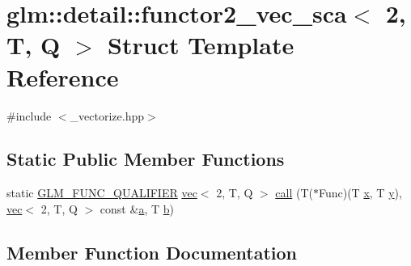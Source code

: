\hypertarget{structglm_1_1detail_1_1functor2__vec__sca_3_012_00_01_t_00_01_q_01_4}{}\section{glm\+:\+:detail\+:\+:functor2\+\_\+vec\+\_\+sca$<$ 2, T, Q $>$ Struct Template Reference}
\label{structglm_1_1detail_1_1functor2__vec__sca_3_012_00_01_t_00_01_q_01_4}


{\ttfamily \#include $<$\+\_\+vectorize.\+hpp$>$}

\subsection*{Static Public Member Functions}
\begin{DoxyCompactItemize}
\item 
static \mbox{\hyperlink{setup_8hpp_a33fdea6f91c5f834105f7415e2a64407}{G\+L\+M\+\_\+\+F\+U\+N\+C\+\_\+\+Q\+U\+A\+L\+I\+F\+I\+ER}} \mbox{\hyperlink{structglm_1_1vec}{vec}}$<$ 2, T, Q $>$ \mbox{\hyperlink{structglm_1_1detail_1_1functor2__vec__sca_3_012_00_01_t_00_01_q_01_4_a706cc99a668c874d6aef44ea579d2901}{call}} (T($\ast$Func)(T \mbox{\hyperlink{_s_d_l__opengl_8h_ad0e63d0edcdbd3d79554076bf309fd47}{x}}, T \mbox{\hyperlink{_s_d_l__opengl_8h_a1675d9d7bb68e1657ff028643b4037e3}{y}}), \mbox{\hyperlink{structglm_1_1vec}{vec}}$<$ 2, T, Q $>$ const \&\mbox{\hyperlink{_s_d_l__opengl__glext_8h_a3309789fc188587d666cda5ece79cf82}{a}}, T \mbox{\hyperlink{_s_d_l__opengl__glext_8h_a0f71581a41fd2264c8944126dabbd010}{b}})
\end{DoxyCompactItemize}


\subsection{Member Function Documentation}
\mbox{\label{structglm_1_1detail_1_1functor2__vec__sca_3_012_00_01_t_00_01_q_01_4_a706cc99a668c874d6aef44ea579d2901}} 
